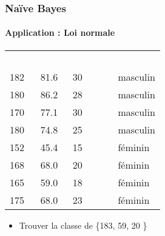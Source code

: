 \documentclass[xcolor=table]{beamer}
\begin{document}
\begin{frame}
	\frametitle{Naïve Bayes}
	\framesubtitle{Application : Loi normale}
	
	\scriptsize
	\begin{center}
		\begin{tabular}{llll}
			\rowcolor{darkblue}
			\textcolor{white}{taille} & \textcolor{white}{poids} & \textcolor{white}{pointure} & \textcolor{white}{sexe} \\
			182 & 81.6 & 30 & masculin\\
			180 & 86.2 & 28 & masculin\\
			170 & 77.1 & 30 & masculin\\
			180 & 74.8 & 25 & masculin\\
			152 & 45.4 & 15 & féminin\\
			168 & 68.0 & 20 & féminin\\
			165 & 59.0 & 18 & féminin\\
			175 & 68.0 & 23 & féminin\\
		\end{tabular}
	\end{center}
	
	\begin{itemize}
		\item Trouver la classe de \{183, 59, 20 \}
	\end{itemize}
	
	
\end{frame}

\end{document}
